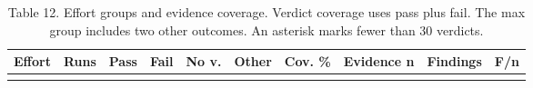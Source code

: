 \documentclass[
  10pt,
  a4paper,
]{article}
\begin{document}
\begin{longtable}[]{@{}
  >{\raggedright\arraybackslash}p{}
  >{\raggedleft\arraybackslash}p{}
  >{\raggedleft\arraybackslash}p{}
  >{\raggedleft\arraybackslash}p{}
  >{\raggedleft\arraybackslash}p{}
  >{\raggedleft\arraybackslash}p{}
  >{\raggedleft\arraybackslash}p{}
  >{\raggedleft\arraybackslash}p{}
  >{\raggedleft\arraybackslash}p{}
  >{\raggedleft\arraybackslash}p{}@{}}
\caption{Table 12. Effort groups and evidence coverage. Verdict coverage
uses pass plus fail. The max group includes two other outcomes. An
asterisk marks fewer than 30 verdicts.}\tabularnewline
\toprule\noalign{}
\begin{minipage}[b]{\linewidth}\raggedright
Effort
\end{minipage} & \begin{minipage}[b]{\linewidth}\raggedleft
Runs
\end{minipage} & \begin{minipage}[b]{\linewidth}\raggedleft
Pass
\end{minipage} & \begin{minipage}[b]{\linewidth}\raggedleft
Fail
\end{minipage} & \begin{minipage}[b]{\linewidth}\raggedleft
No v.
\end{minipage} & \begin{minipage}[b]{\linewidth}\raggedleft
Other
\end{minipage} & \begin{minipage}[b]{\linewidth}\raggedleft
Cov. \%
\end{minipage} & \begin{minipage}[b]{\linewidth}\raggedleft
Evidence n
\end{minipage} & \begin{minipage}[b]{\linewidth}\raggedleft
Findings
\end{minipage} & \begin{minipage}[b]{\linewidth}\raggedleft
F/n
\end{minipage} \\
\midrule\noalign{}
\endfirsthead

\end{longtable}
\end{document}
